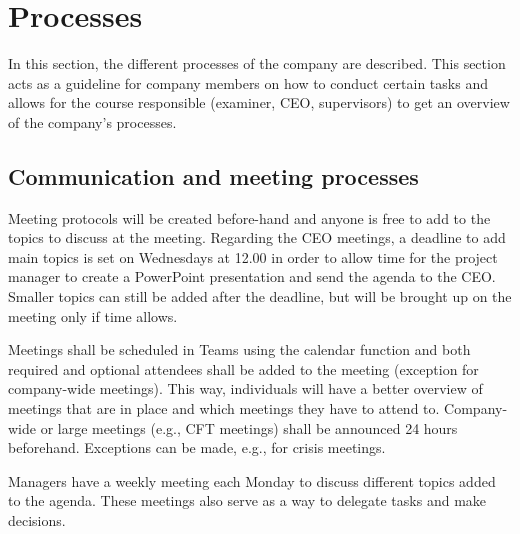 \section{Processes}
\label{sec:companywide:subsection:cwgeneral}
In this section, the different processes of the company are described. This section acts as a guideline for company members on how to conduct certain tasks and allows for the course responsible (examiner, CEO, supervisors) to get an overview of the company's processes. 



\subsection{Communication and meeting processes}
Meeting protocols will be created before-hand and anyone is free to add to the topics to discuss at the meeting. Regarding the CEO meetings, a deadline to add main topics is set on Wednesdays at 12.00 in order to allow time for the project manager to create a PowerPoint presentation and send the agenda to the CEO. Smaller topics can still be added after the deadline, but will be brought up on the meeting only if time allows.

Meetings shall be scheduled in Teams using the calendar function and both required and optional attendees shall be added to the meeting (exception for company-wide meetings). This way, individuals will have a better overview of meetings that are in place and which meetings they have to attend to. Company-wide or large meetings (e.g., CFT meetings) shall be announced 24 hours beforehand. Exceptions can be made, e.g., for crisis meetings. 

Managers have a weekly meeting each Monday to discuss different topics added to the agenda. These meetings also serve as a way to delegate tasks and make decisions. 

